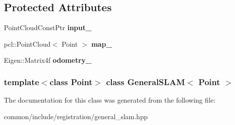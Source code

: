 \subsection*{Protected Attributes}
\begin{DoxyCompactItemize}
\item 
\hypertarget{classGeneralSLAM_3_01Point_01_4_a250138ef64661c18894c16ed142b7d5f}{
PointCloudConstPtr {\bfseries input\_\-}}
\label{classGeneralSLAM_3_01Point_01_4_a250138ef64661c18894c16ed142b7d5f}

\item 
\hypertarget{classGeneralSLAM_3_01Point_01_4_a5b4fe56676045b85659fc8498ef06d66}{
pcl::PointCloud$<$ Point $>$ {\bfseries map\_\-}}
\label{classGeneralSLAM_3_01Point_01_4_a5b4fe56676045b85659fc8498ef06d66}

\item 
\hypertarget{classGeneralSLAM_3_01Point_01_4_a24025bdd56359ca77b79bc28b8412264}{
Eigen::Matrix4f {\bfseries odometry\_\-}}
\label{classGeneralSLAM_3_01Point_01_4_a24025bdd56359ca77b79bc28b8412264}

\end{DoxyCompactItemize}
\subsubsection*{template$<$class Point$>$ class GeneralSLAM$<$ Point $>$}



The documentation for this class was generated from the following file:\begin{DoxyCompactItemize}
\item 
common/include/registration/general\_\-slam.hpp\end{DoxyCompactItemize}
